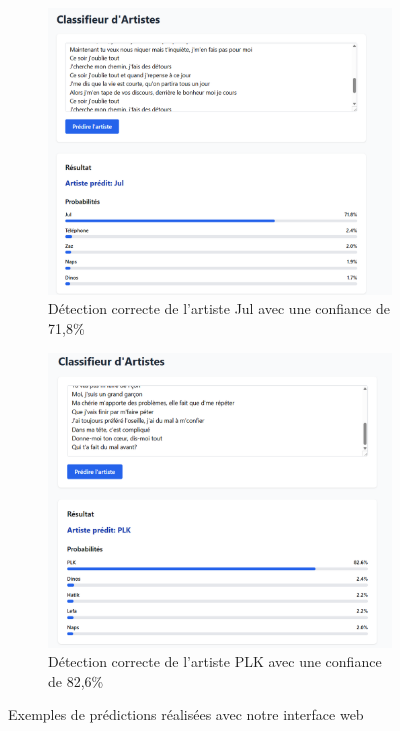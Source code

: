 \documentclass[a4paper,11pt]{article}
\begin{document}
\begin{figure}[ht]
    \centering
    \begin{subfigure}[b]{0.8\textwidth}
        \centering
        \includegraphics[width=\textwidth]{results_rapport/jul.png}
        \caption{Détection correcte de l'artiste Jul avec une confiance de 71,8\%}
        \label{fig:jul-detection}
    \end{subfigure}
    \vspace{0.5cm}
    \begin{subfigure}[b]{0.8\textwidth}
        \centering
        \includegraphics[width=\textwidth]{results_rapport/plk.png}
        \caption{Détection correcte de l'artiste PLK avec une confiance de 82,6\%}
        \label{fig:plk-detection}
    \end{subfigure}
    \caption{Exemples de prédictions réalisées avec notre interface web}
    \label{fig:web-interface}
\end{figure}
\end{document}
